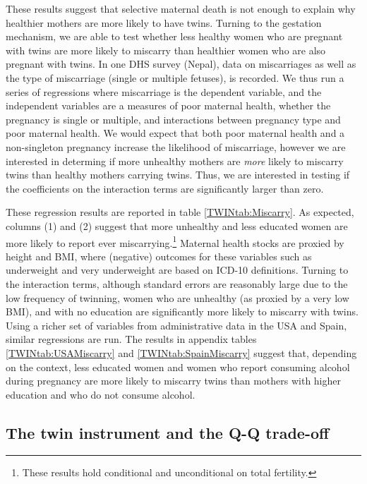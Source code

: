 \documentclass[subeqn]{article}
\begin{document}
\begin{spacing}{1.4}
These results suggest that selective maternal death is not enough to explain
why healthier mothers are more likely to have twins. Turning to the gestation 
mechanism, we are able to test whether less healthy women who are pregnant with 
twins are more likely to miscarry than healthier women who are also pregnant 
with twins.  In one DHS survey (Nepal), data on miscarriages as well as the 
type of miscarriage (single or multiple fetuses), is recorded.  We thus run a 
series of regressions where miscarriage is the dependent variable, and the 
independent variables are a measures of poor maternal health, whether the 
pregnancy is single or multiple, and interactions between pregnancy type and 
poor maternal health.  We would expect that both poor maternal health and a 
non-singleton pregnancy increase the likelihood of miscarriage, however we are 
interested in determing if more unhealthy mothers are \emph{more} likely to 
miscarry twins than healthy mothers carrying twins.  Thus, we are interested in 
testing if the coefficients on the interaction terms are significantly larger 
than zero.

These regression results are reported in table \ref{TWINtab:Miscarry}.  As 
expected, columns (1) and (2) suggest that more unhealthy and less educated
women are more likely to report ever miscarrying.\footnote{These results hold 
conditional and unconditional on total fertility.}  Maternal health stocks 
are proxied by height and BMI, where (negative) outcomes for these variables
such as underweight and very underweight are based on ICD-10 definitions.  
Turning to the interaction terms, although standard errors are reasonably large 
due to the low frequency of twinning, women who are unhealthy (as proxied by a 
very low BMI), and with no education are significantly more likely to miscarry 
with twins.  Using a richer set of variables from administrative data in the USA 
and Spain, similar regressions are run.  The results in appendix tables 
\ref{TWINtab:USAMiscarry} and \ref{TWINtab:SpainMiscarry} suggest that, 
depending on the context, less educated women and women who report consuming 
alcohol during pregnancy are more likely to miscarry twins than mothers with 
higher education and who do not consume alcohol.

\subsection{The twin instrument and the Q-Q trade-off} \label{TWINsscn:QQtwins}


\end{spacing}
\end{document}
